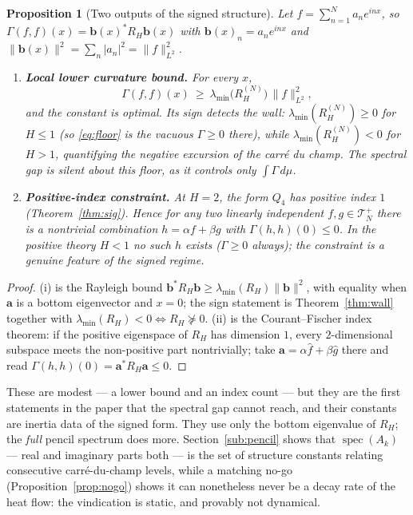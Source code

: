 \documentclass[11pt,reqno]{amsart}
\theoremstyle{plain}
\newtheorem{proposition}[theorem]{Proposition}
\theoremstyle{definition}
\newcommand{\Gam}{\Gamma}
\DeclareMathOperator{\spec}{spec}
\begin{document}
\begin{proposition}[Two outputs of the signed structure]\label{prop:produces}
Let $f=\sum_{n=1}^{N}a_ne^{inx}$, so $\Gam(f,f)(x)=\mathbf b(x)^{*}R_H\mathbf b(x)$
with $\mathbf b(x)_n=a_ne^{inx}$ and $\|\mathbf b(x)\|^2=\sum_n|a_n|^2=\|f\|^2_{L^2}$.
\begin{enumerate}[label=\textup{(\roman*)},leftmargin=2.2em]
\item \textbf{Local lower curvature bound.} For every $x$,
\begin{equation}\label{eq:floor}
  \Gam(f,f)(x)\ \ge\ \lambda_{\min}\!\bigl(R_H^{(N)}\bigr)\,\|f\|^2_{L^2},
\end{equation}
and the constant is optimal. Its sign \emph{detects the wall}:
$\lambda_{\min}(R_H^{(N)})\ge0$ for $H\le1$ \textup(so \eqref{eq:floor} is the
vacuous $\Gam\ge0$ there\textup), while $\lambda_{\min}(R_H^{(N)})<0$ for $H>1$,
quantifying the negative excursion of the carr\'e du champ. The spectral gap is
silent about this floor, as it controls only $\int\Gam\,d\mu$.
\item \textbf{Positive-index constraint.} At $H=2$, the form $Q_4$ has positive
index $1$ (Theorem~\ref{thm:sig}). Hence for any two linearly independent
$f,g\in\mathcal T_N^{+}$ there is a nontrivial combination $h=\alpha f+\beta g$
with $\Gam(h,h)(0)\le0$. In the positive theory $H<1$ no such $h$ exists
($\Gam\ge0$ always); the constraint is a genuine feature of the signed regime.
\end{enumerate}
\end{proposition}

\begin{proof}
(i) is the Rayleigh bound $\mathbf b^{*}R_H\mathbf b\ge\lambda_{\min}(R_H)
\|\mathbf b\|^2$, with equality when $\mathbf a$ is a bottom eigenvector and $x=0$;
the sign statement is Theorem~\ref{thm:wall} together with
$\lambda_{\min}(R_H)<0\Leftrightarrow R_H\not\succeq0$. (ii) is the Courant--Fischer
index theorem: if the positive eigenspace of $R_H$ has dimension $1$, every
$2$-dimensional subspace meets the non-positive part nontrivially; take
$\mathbf a=\alpha\hat f+\beta\hat g$ there and read $\Gam(h,h)(0)=\mathbf a^{*}
R_H\mathbf a\le0$.
\end{proof}

These are modest --- a lower bound and an index count --- but they are the first
statements in the paper that the spectral gap cannot reach, and their constants
are inertia data of the signed form. They use only the bottom eigenvalue of
$R_H$; the \emph{full} pencil spectrum does more. Section~\ref{sub:pencil} shows
that $\spec(A_k)$ --- real and imaginary parts both --- is the set of structure
constants relating consecutive carr\'e-du-champ levels, while a matching no-go
(Proposition~\ref{prop:nogo}) shows it can nonetheless never be a decay rate of the
heat flow: the vindication is static, and provably not dynamical.
\end{document}
